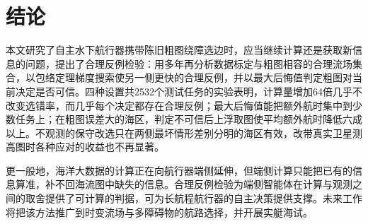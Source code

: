 \section{结论}
\label{sec:conclusion}

本文研究了自主水下航行器携带陈旧粗图绕障选边时，应当继续计算还是获取新信息的问题，提出了合理反例检验：用多年再分析数据标定与粗图相容的合理流场集合，以包络定理梯度搜索使另一侧更快的合理反例，并以最大后悔值判定粗图对当前决定是否可信。四种设置共2532个测试任务的实验表明，计算量增加64倍几乎不改变选错率，而几乎每个决定都存在合理反例；最大后悔值能把额外航时集中到少数任务上；在粗图误差大的海区，判定不可信后上浮取图使平均额外航时降低六成以上。不观测的保守改选只在两侧最坏情形差别分明的海区有效，改带真实卫星测高图时各种应对的收益也不再显著。

更一般地，海洋大数据的计算正在向航行器端侧延伸，但端侧计算只能把已有的信息算准，补不回海流图中缺失的信息。合理反例检验为端侧智能体在计算与观测之间的取舍提供了可计算的判据，可为长航程航行器的自主决策提供支撑。未来工作将把该方法推广到时变流场与多障碍物的航路选择，并开展实艇海试。
